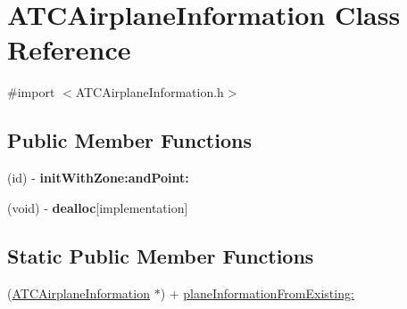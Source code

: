 \hypertarget{interface_a_t_c_airplane_information}{
\section{\-A\-T\-C\-Airplane\-Information \-Class \-Reference}
\label{interface_a_t_c_airplane_information}
}


{\ttfamily \#import $<$\-A\-T\-C\-Airplane\-Information.\-h$>$}

\subsection*{\-Public \-Member \-Functions}
\begin{DoxyCompactItemize}
\item 
\hypertarget{interface_a_t_c_airplane_information_ab14e098122c2950093db2f6a617ca496}{
(id) -\/ {\bfseries init\-With\-Zone\-:and\-Point\-:}}
\label{interface_a_t_c_airplane_information_ab14e098122c2950093db2f6a617ca496}

\item 
\hypertarget{interface_a_t_c_airplane_information_a7fbd6eb3b64741cc4d1184c3292cd5b4}{
(void) -\/ {\bfseries dealloc}{\ttfamily  \mbox{[}implementation\mbox{]}}}
\label{interface_a_t_c_airplane_information_a7fbd6eb3b64741cc4d1184c3292cd5b4}

\end{DoxyCompactItemize}
\subsection*{\-Static \-Public \-Member \-Functions}
\begin{DoxyCompactItemize}
\item 
(\hyperlink{interface_a_t_c_airplane_information}{\-A\-T\-C\-Airplane\-Information} $\ast$) + \hyperlink{interface_a_t_c_airplane_information_a71be041249e50f0a6b3b9c6c7fd96723}{plane\-Information\-From\-Existing\-:}
\end{DoxyCompactItemize}
